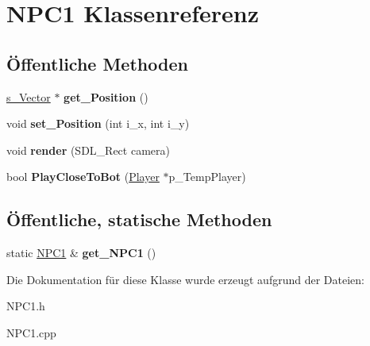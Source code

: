 \hypertarget{class_n_p_c1}{\section{N\-P\-C1 Klassenreferenz}
\label{class_n_p_c1}
}
\subsection*{Öffentliche Methoden}
\begin{DoxyCompactItemize}
\item 
\hypertarget{class_n_p_c1_aa76eead3904b61145d210ee5d077fab9}{\hyperlink{structs___vector}{s\-\_\-\-Vector} $\ast$ {\bfseries get\-\_\-\-Position} ()}\label{class_n_p_c1_aa76eead3904b61145d210ee5d077fab9}

\item 
\hypertarget{class_n_p_c1_a6f7d2842c3ad04969ed90722324875b4}{void {\bfseries set\-\_\-\-Position} (int i\-\_\-x, int i\-\_\-y)}\label{class_n_p_c1_a6f7d2842c3ad04969ed90722324875b4}

\item 
\hypertarget{class_n_p_c1_a3fa4f42017cbef90df3fc010de47f452}{void {\bfseries render} (S\-D\-L\-\_\-\-Rect camera)}\label{class_n_p_c1_a3fa4f42017cbef90df3fc010de47f452}

\item 
\hypertarget{class_n_p_c1_a630634825b51471ec57664e03f8f69c1}{bool {\bfseries Play\-Close\-To\-Bot} (\hyperlink{class_player}{Player} $\ast$p\-\_\-\-Temp\-Player)}\label{class_n_p_c1_a630634825b51471ec57664e03f8f69c1}

\end{DoxyCompactItemize}
\subsection*{Öffentliche, statische Methoden}
\begin{DoxyCompactItemize}
\item 
\hypertarget{class_n_p_c1_aa44be35612f75bcfb437dc5277f63b57}{static \hyperlink{class_n_p_c1}{N\-P\-C1} \& {\bfseries get\-\_\-\-N\-P\-C1} ()}\label{class_n_p_c1_aa44be35612f75bcfb437dc5277f63b57}

\end{DoxyCompactItemize}


Die Dokumentation für diese Klasse wurde erzeugt aufgrund der Dateien\-:\begin{DoxyCompactItemize}
\item 
N\-P\-C1.\-h\item 
N\-P\-C1.\-cpp\end{DoxyCompactItemize}
